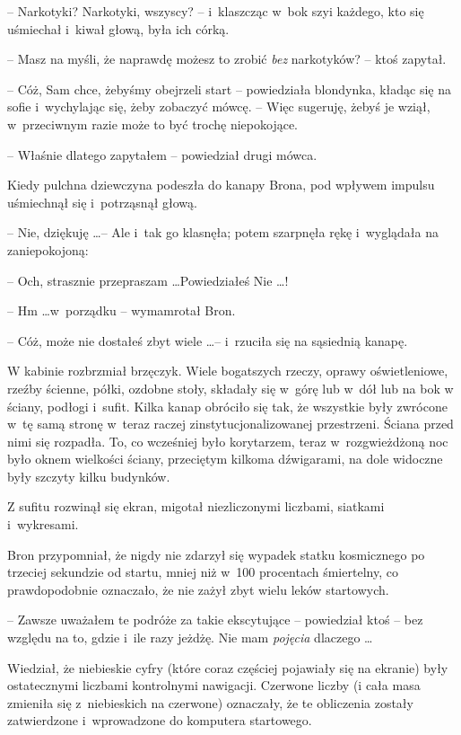 \documentclass[oneside,polish,11pt,rmheadings]{mwbk}
\begin{document}
-- Narkotyki? Narkotyki, wszyscy? -- i~klaszcząc w~bok szyi każdego, kto się uśmiechał i~kiwał głową, była ich córką. 

-- Masz na myśli, że naprawdę możesz to zrobić \textit{bez  }narkotyków? -- ktoś zapytał. 

-- Cóż, Sam chce, żebyśmy obejrzeli start -- powiedziała blondynka, kładąc się na sofie i~wychylając się, żeby zobaczyć mówcę. -- Więc sugeruję, żebyś je wziął, w~przeciwnym razie może to być trochę niepokojące. 

-- Właśnie dlatego zapytałem -- powiedział drugi mówca. 

Kiedy pulchna dziewczyna podeszła do kanapy Brona, pod wpływem impulsu uśmiechnął się i~potrząsnął głową. 

-- Nie, dziękuję \ldots -- Ale i~tak go klasnęła; potem szarpnęła rękę i~wyglądała na zaniepokojoną: 

-- Och, strasznie przepraszam \ldots  Powiedziałeś Nie \ldots ! 

-- Hm \ldots  w~porządku -- wymamrotał Bron. 

-- Cóż, może nie dostałeś zbyt wiele  \ldots  -- i~rzuciła się na sąsiednią kanapę. 

W kabinie rozbrzmiał brzęczyk. Wiele bogatszych rzeczy, oprawy oświetleniowe, rzeźby ścienne, półki, ozdobne stoły, składały się w~górę lub w~dół lub na bok  w ściany, podłogi i~sufit. Kilka kanap obróciło się tak, że wszystkie były zwrócone w~tę samą stronę w~teraz raczej zinstytucjonalizowanej przestrzeni. Ściana przed nimi się rozpadła. To, co wcześniej było korytarzem, teraz w~rozgwieżdżoną noc było oknem wielkości ściany, przeciętym kilkoma dźwigarami, na dole widoczne były szczyty kilku budynków. 

Z sufitu rozwinął się ekran, migotał niezliczonymi liczbami, siatkami i~wykresami. 

Bron przypomniał, że nigdy nie zdarzył się wypadek statku kosmicznego po trzeciej sekundzie od startu, mniej niż w~100 procentach śmiertelny, co prawdopodobnie oznaczało, że nie zażył zbyt wielu leków startowych. 

-- Zawsze uważałem te podróże za takie ekscytujące -- powiedział ktoś -- bez względu na to, gdzie i~ile razy jeżdżę. Nie mam \textit{pojęcia }dlaczego \ldots  

Wiedział, że niebieskie cyfry (które coraz częściej pojawiały się na ekranie) były ostatecznymi liczbami kontrolnymi nawigacji. Czerwone liczby (i cała masa zmieniła się z~niebieskich na czerwone) oznaczały, że te obliczenia zostały zatwierdzone i~wprowadzone do komputera startowego. 
\end{document}
